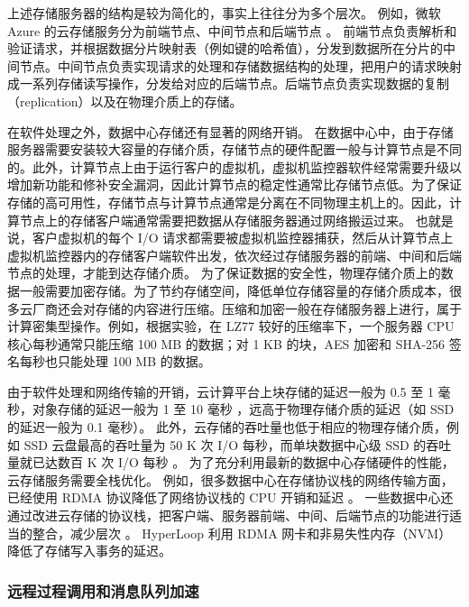 上述存储服务器的结构是较为简化的，事实上往往分为多个层次。
例如，微软 Azure 的云存储服务分为前端节点、中间节点和后端节点 \cite{calder2011windows}。
前端节点负责解析和验证请求，并根据数据分片映射表（例如键的哈希值），分发到数据所在分片的中间节点。中间节点负责实现请求的处理和存储数据结构的处理，把用户的请求映射成一系列存储读写操作，分发给对应的后端节点。后端节点负责实现数据的复制（replication）以及在物理介质上的存储。

在软件处理之外，数据中心存储还有显著的网络开销。
在数据中心中，由于存储服务器需要安装较大容量的存储介质，存储节点的硬件配置一般与计算节点是不同的。此外，计算节点上由于运行客户的虚拟机，虚拟机监控器软件经常需要升级以增加新功能和修补安全漏洞，因此计算节点的稳定性通常比存储节点低。为了保证存储的高可用性，存储节点与计算节点通常是分离在不同物理主机上的。因此，计算节点上的存储客户端通常需要把数据从存储服务器通过网络搬运过来。
也就是说，客户虚拟机的每个 I/O 请求都需要被虚拟机监控器捕获，然后从计算节点上虚拟机监控器内的存储客户端软件出发，依次经过存储服务器的前端、中间和后端节点的处理，才能到达存储介质。
为了保证数据的安全性，物理存储介质上的数据一般需要加密存储。为了节约存储空间，降低单位存储容量的存储介质成本，很多云厂商还会对存储的内容进行压缩。压缩和加密一般在存储服务器上进行，属于计算密集型操作。例如，根据实验，在 LZ77 较好的压缩率下，一个服务器 CPU 核心每秒通常只能压缩 100 MB 的数据；对 1 KB 的块，AES 加密和 SHA-256 签名每秒也只能处理 100 MB 的数据。

由于软件处理和网络传输的开销，云计算平台上块存储的延迟一般为 0.5 至 1 毫秒，对象存储的延迟一般为 1 至 10 毫秒 \cite{jonas2019cloud}，远高于物理存储介质的延迟（如 SSD 的延迟一般为 0.1 毫秒）。
此外，云存储的吞吐量也低于相应的物理存储介质，例如 SSD 云盘最高的吞吐量为 50 K 次 I/O 每秒，而单块数据中心级 SSD 的吞吐量就已达数百 K 次 I/O 每秒 \cite{jonas2019cloud}。
为了充分利用最新的数据中心存储硬件的性能，云存储服务需要全栈优化。
例如，很多数据中心在存储协议栈的网络传输方面，已经使用 RDMA 协议降低了网络协议栈的 CPU 开销和延迟 \cite{guo2016rdma}。
一些数据中心还通过改进云存储的协议栈，把客户端、服务器前端、中间、后端节点的功能进行适当的整合，减少层次 \cite{nitro-blog}。
HyperLoop \cite{kim2018hyperloop} 利用 RDMA 网卡和非易失性内存（NVM）降低了存储写入事务的延迟。

\subsubsection{远程过程调用和消息队列加速}
\label{future:rpc}

